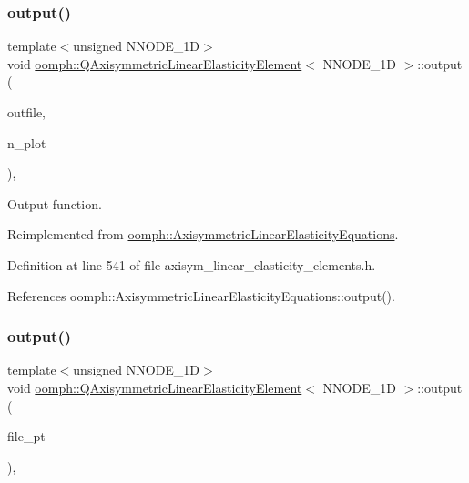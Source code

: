 \subsubsection{\texorpdfstring{output()}{output()}\hspace{0.1cm}{\footnotesize\ttfamily [2/4]}}
{\footnotesize\ttfamily template$<$unsigned N\+N\+O\+D\+E\+\_\+1D$>$ \\
void \hyperlink{classoomph_1_1QAxisymmetricLinearElasticityElement}{oomph\+::\+Q\+Axisymmetric\+Linear\+Elasticity\+Element}$<$ N\+N\+O\+D\+E\+\_\+1D $>$\+::output (\begin{DoxyParamCaption}\item[{std\+::ostream \&}]{outfile,  }\item[{const unsigned \&}]{n\+\_\+plot }\end{DoxyParamCaption})\hspace{0.3cm}{\ttfamily [inline]}, {\ttfamily [virtual]}}



Output function. 



Reimplemented from \hyperlink{classoomph_1_1AxisymmetricLinearElasticityEquations_a55d90a70997efe0a5cf34e269e0cf6b8}{oomph\+::\+Axisymmetric\+Linear\+Elasticity\+Equations}.



Definition at line 541 of file axisym\+\_\+linear\+\_\+elasticity\+\_\+elements.\+h.



References oomph\+::\+Axisymmetric\+Linear\+Elasticity\+Equations\+::output().

\mbox{\label{classoomph_1_1QAxisymmetricLinearElasticityElement_abc4653b755224731a24d641619b2c14e}} 
\subsubsection{\texorpdfstring{output()}{output()}\hspace{0.1cm}{\footnotesize\ttfamily [3/4]}}
{\footnotesize\ttfamily template$<$unsigned N\+N\+O\+D\+E\+\_\+1D$>$ \\
void \hyperlink{classoomph_1_1QAxisymmetricLinearElasticityElement}{oomph\+::\+Q\+Axisymmetric\+Linear\+Elasticity\+Element}$<$ N\+N\+O\+D\+E\+\_\+1D $>$\+::output (\begin{DoxyParamCaption}\item[{F\+I\+LE $\ast$}]{file\+\_\+pt }\end{DoxyParamCaption})\hspace{0.3cm}{\ttfamily [inline]}, {\ttfamily [virtual]}}



